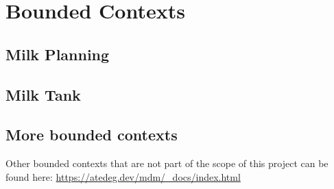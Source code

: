 \chapter{Bounded Contexts}
\section{Milk Planning}
\section{Milk Tank}

\section{More bounded contexts}
Other bounded contexts that are not part of the scope of this project can be found here: \url{https://atedeg.dev/mdm/_docs/index.html}